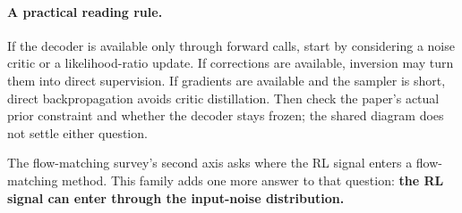 \paragraph{A practical reading rule.} If the decoder is available only through forward calls, start by considering a noise critic or a likelihood-ratio update. If corrections are available, inversion may turn them into direct supervision. If gradients are available and the sampler is short, direct backpropagation avoids critic distillation. Then check the paper's actual prior constraint and whether the decoder stays frozen; the shared diagram does not settle either question.

The flow-matching survey's second axis asks where the RL signal enters a flow-matching method. This family adds one more answer to that question: \textbf{the RL signal can enter through the input-noise distribution.}

